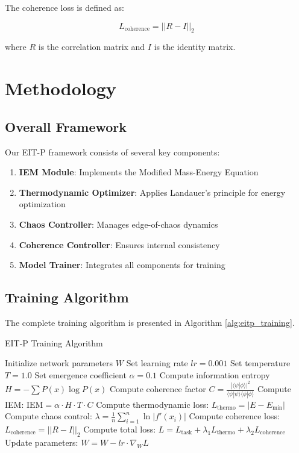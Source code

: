 \documentclass[12pt]{article}
\begin{document}
The coherence loss is defined as:

\begin{equation}
L_{\text{coherence}} = ||R - I||_2
\end{equation}

where $R$ is the correlation matrix and $I$ is the identity matrix.

\section{Methodology}

\subsection{Overall Framework}

Our EIT-P framework consists of several key components:

\begin{enumerate}
\item \textbf{IEM Module}: Implements the Modified Mass-Energy Equation
\item \textbf{Thermodynamic Optimizer}: Applies Landauer's principle for energy optimization
\item \textbf{Chaos Controller}: Manages edge-of-chaos dynamics
\item \textbf{Coherence Controller}: Ensures internal consistency
\item \textbf{Model Trainer}: Integrates all components for training
\end{enumerate}

\subsection{Training Algorithm}

The complete training algorithm is presented in Algorithm \ref{alg:eitp_training}.

\begin{algorithm}
\caption{EIT-P Training Algorithm}
\label{alg:eitp_training}
\begin{algorithmic}[1]
\STATE Initialize network parameters $W$
\STATE Set learning rate $lr = 0.001$
\STATE Set temperature $T = 1.0$
\STATE Set emergence coefficient $\alpha = 0.1$
        \STATE Compute information entropy $H = -\sum P(x)\log P(x)$
        \STATE Compute coherence factor $C = \frac{|\langle \psi | \phi \rangle|^2}{\langle \psi | \psi \rangle \langle \phi | \phi \rangle}$
        \STATE Compute IEM: $\text{IEM} = \alpha \cdot H \cdot T \cdot C$
        \STATE Compute thermodynamic loss: $L_{\text{thermo}} = |E - E_{\min}|$
        \STATE Compute chaos control: $\lambda = \frac{1}{n} \sum_{i=1}^{n} \ln|f'(x_i)|$
        \STATE Compute coherence loss: $L_{\text{coherence}} = ||R - I||_2$
        \STATE Compute total loss: $L = L_{\text{task}} + \lambda_1 L_{\text{thermo}} + \lambda_2 L_{\text{coherence}}$
        \STATE Update parameters: $W = W - lr \cdot \nabla_W L$
    \ENDFOR
\ENDFOR
\end{algorithmic}
\end{algorithm}
\end{document}
